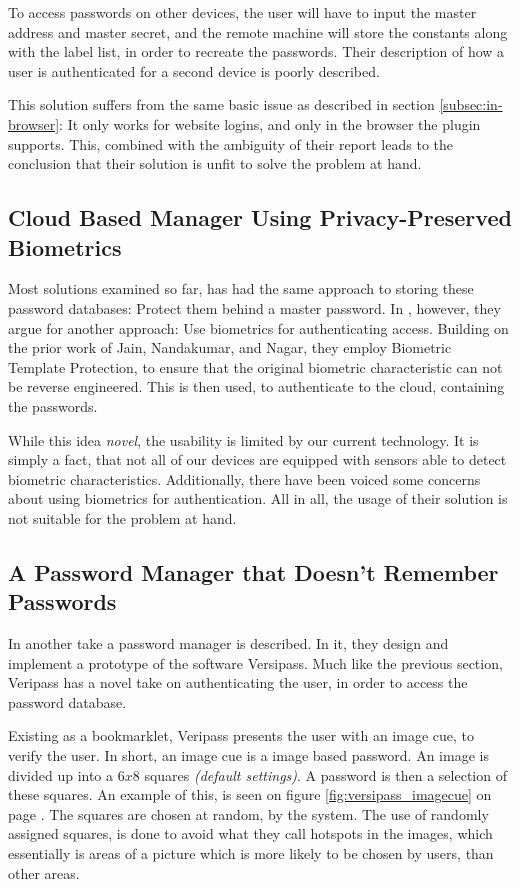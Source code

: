 			To access passwords on other devices, the user will have to input the master address and master secret, and the remote machine will store the constants along with the label list, in order to recreate the passwords. Their description of how a user is authenticated for a second device is poorly described.

			This solution suffers from the same basic issue as described in section \ref{subsec:in-browser}: It only works for website logins, and only in the browser the plugin supports. This, combined with the ambiguity of their report leads to the conclusion that their solution is unfit to solve the problem at hand.


		\subsection*{Cloud Based Manager Using Privacy-Preserved Biometrics}
			Most solutions examined so far, has had the same approach to storing these password databases: Protect them behind a master password. In \cite{busch2014}, however, they argue for another approach: Use biometrics for authenticating access. Building on the prior work of Jain, Nandakumar, and Nagar, they employ Biometric Template Protection, to ensure that the original biometric characteristic can not be reverse engineered. This is then used, to authenticate to the cloud, containing the passwords.


			While this idea \emph{novel}, the usability is limited by our current technology. It is simply a fact, that not all of our devices are equipped with sensors able to detect biometric characteristics. Additionally, there have been voiced some concerns about using biometrics for authentication. All in all, the usage of their solution is not suitable for the problem at hand.

		\subsection*{A Password Manager that Doesn’t Remember Passwords}
			In \cite{stobert2014} another take a password manager is described. In it, they design and implement a prototype of the software Versipass. Much like the previous section, Veripass has a novel take on authenticating the user, in order to access the password database.

			Existing as a bookmarklet, Veripass presents the user with an image cue, to verify the user. In short, an image cue is a image based password. An image is divided up into a $6x8$ squares \emph{(default settings)}. A password is then a selection of these squares. An example of this, is seen on figure \ref{fig:versipass_imagecue} on page \pageref{fig:versipass_imagecue}. The squares are chosen at random, by the system. The use of randomly assigned squares, is done to avoid what they call hotspots in the images, which essentially is areas of a picture which is more likely to be chosen by users, than other areas. 

